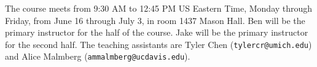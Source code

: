 The course meets from 9:30 AM to 12:45 PM US Eastern Time, Monday
through Friday, from June 16 through July 3, in room 1437 Mason
Hall. Ben will be the primary instructor for the half of the
course. Jake will be the primary instructor for the second half.  The
teaching assistants are Tyler Chen
(\texttt{tylercr@umich.edu}) and Alice Malmberg
(\texttt{ammalmberg@ucdavis.edu}).


